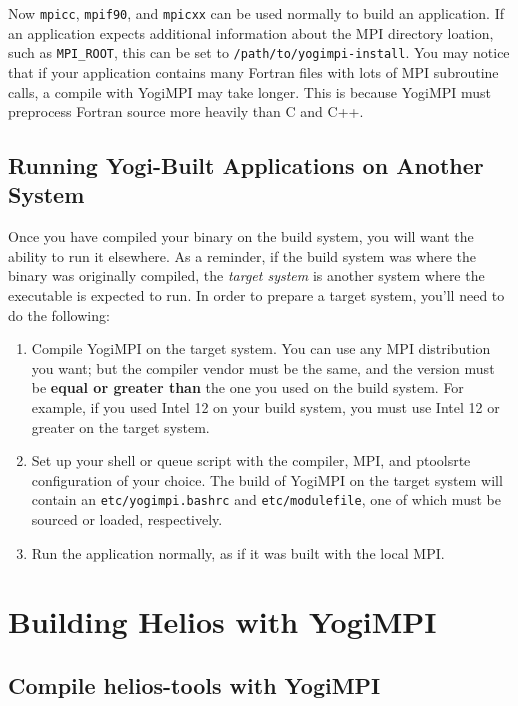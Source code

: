 \documentclass{article}
\begin{document}
Now \texttt{mpicc}, \texttt{mpif90}, and \texttt{mpicxx} can be used normally to build an application. If an application expects additional information about the MPI directory loation, such as \texttt{MPI\_ROOT}, this can be set to \texttt{/path/to/yogimpi-install}. You may notice that if your application contains many Fortran files with lots of MPI subroutine calls, a compile with YogiMPI may take longer.  This is because YogiMPI must preprocess Fortran source more heavily than C and C++.

\subsection{Running Yogi-Built Applications on Another System}

Once you have compiled your binary on the build system, you will want the ability to run it elsewhere.  As a reminder, if the build system was where the binary was originally compiled, the \textit{target system} is another system where the executable is expected to run.  In order to prepare a target system, you'll need to do the following:

\begin{enumerate}
\item Compile YogiMPI on the target system.  You can use any MPI distribution you want; but the compiler vendor must be the same, and the version must be \textbf{equal or greater than} the one you used on the build system.  For example, if you used Intel 12 on your build system, you must use Intel 12 or greater on the target system.
\item Set up your shell or queue script with the compiler, MPI, and ptoolsrte configuration of your choice.  The build of YogiMPI on the target system will contain an \texttt{etc/yogimpi.bashrc} and \texttt{etc/modulefile}, one of which must be sourced or loaded, respectively.
\item Run the application normally, as if it was built with the local MPI.
\end{enumerate}

\section{Building Helios with YogiMPI}

\subsection{Compile helios-tools with YogiMPI}
\end{document}
